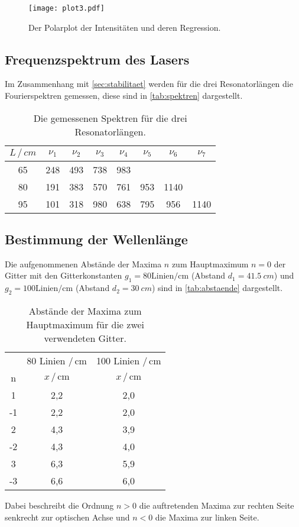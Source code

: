 \begin{figure}
    \centering
    \texttt{[image: plot3.pdf]}
    \caption{Der Polarplot der Intensitäten und deren Regression.}
    \label{fig:plot3}
\end{figure}


\subsection{Frequenzspektrum des Lasers} \label{sec:spektrum}
Im Zusammenhang mit \autoref{sec:stabilitaet} werden für die drei Resonatorlängen die Fourierspektren gemessen,
diese sind in \autoref{tab:spektren} dargestellt.
\begin{table}
    \centering
    \caption{Die gemessenen Spektren für die drei Resonatorlängen.}
    \label{tab:spektren}
    \begin{tabular}{c c c c c c c c}
        \toprule
        $L \, / \, cm$ & $\nu_1$ & $\nu_2$ & $\nu_3$ & $\nu_4$ & $\nu_5$ & $\nu_6$ & $\nu_7$ \\
        \midrule
           65 &  248 &  493 &  738 &  983 &       &        &        \\
           80 &  191 &  383 &  570 &  761 & 953 & 1140 &        \\
           95 &  101 &  318 &  980 &  638 & 795 &  956 & 1140 \\
        \bottomrule
    \end{tabular}
\end{table}


\subsection{Bestimmung der Wellenlänge} \label{sec:lambda}
Die aufgenommenen Abstände der Maxima $n$ zum Hauptmaximum $n = 0$ der Gitter mit den Gitterkonstanten $g_1 = 80 \text{Linien}/\mathrm{cm}$ (Abstand $d_1 = \qty{41,5}{cm}$) und
$g_2 = 100 \text{Linien}/\mathrm{cm}$ (Abstand $d_2 = \qty{30}{cm}$) sind in \autoref{tab:abstaende} dargestellt.
\begin{table}
    \centering
    \caption{Abstände der Maxima zum Hauptmaximum für die zwei verwendeten Gitter.}
    \label{tab:abstaende}
    \begin{tabular}{c c c}
        \toprule
           &  80 Linien $/ \, \mathrm{cm}$ &  100 Linien $/ \, \mathrm{cm}$ \\
         n &  $x \, / \, \mathrm{cm}$ &  $x \, / \, \mathrm{cm}$ \\
        \midrule
         1 &     2,2 &       2,0 \\
        -1 &     2,2 &       2,0 \\
         2 &     4,3 &       3,9 \\
        -2 &     4,3 &       4,0 \\
         3 &     6,3 &       5,9 \\
        -3 &     6,6 &       6,0 \\
        \bottomrule
    \end{tabular}
\end{table}
Dabei beschreibt die Ordnung $n>0$ die auftretenden Maxima zur rechten Seite
senkrecht zur optischen Achse und $n<0$ die Maxima zur linken Seite.

